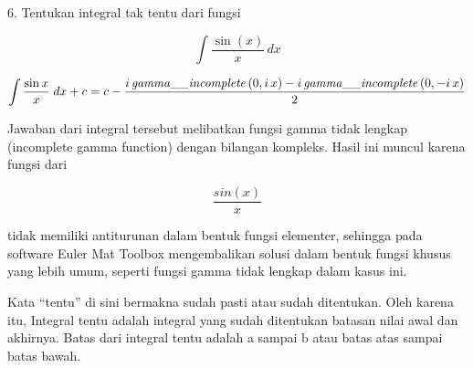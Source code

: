 \documentclass[a4paper,10pt]{article}
\begin{document}
\begin{eulernotebook}
\begin{eulercomment}
\begin{eulercomment}
\begin{eulercomment}
\begin{eulercomment}
\begin{eulercomment}
6. Tentukan integral tak tentu dari fungsi\\
\end{eulercomment}
\begin{eulerformula}
\[
\int\frac{\sin(x)}{x}\,dx
\]
\end{eulerformula}
\begin{eulerformula}
\[
\int {\frac{\sin x}{x}}{\;dx}+c=c-\frac{i\,  {\it gamma\_\_incomplete}\left(0 , i\,x\right)-i\,  {\it gamma\_\_incomplete}\left(0 , -i\,x\right)}{2}
\]
\end{eulerformula}
\begin{eulercomment}
Jawaban dari integral tersebut melibatkan fungsi gamma tidak lengkap
(incomplete gamma function) dengan bilangan kompleks. Hasil ini muncul
karena fungsi dari\\
\end{eulercomment}
\begin{eulerformula}
\[
\frac{sin(x)}{x}
\]
\end{eulerformula}
\begin{eulercomment}
tidak memiliki antiturunan dalam bentuk fungsi elementer, sehingga
pada software Euler Mat Toolbox mengembalikan solusi dalam bentuk
fungsi khusus yang lebih umum, seperti fungsi gamma tidak lengkap
dalam kasus ini.
\end{eulercomment}
\begin{eulercomment}
\end{eulercomment}
\begin{eulercomment}
Kata “tentu” di sini bermakna sudah pasti atau sudah ditentukan. Oleh
karena itu, Integral tentu adalah integral yang sudah ditentukan
batasan nilai awal dan akhirnya. Batas dari integral tentu adalah a
sampai b atau batas atas sampai batas bawah.



\end{eulercomment}
\end{eulercomment}
\end{eulercomment}
\end{eulercomment}
\end{eulercomment}
\end{eulernotebook}
\end{document}
